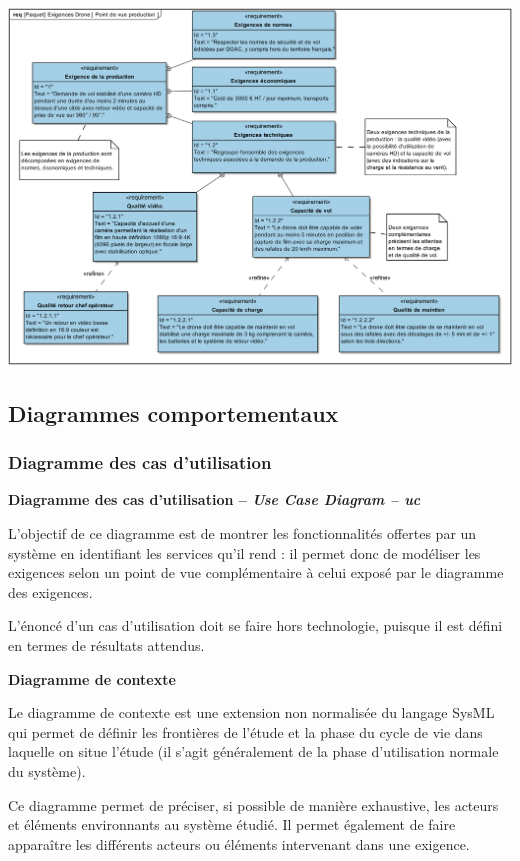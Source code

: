 \documentclass[11pt,oneside]{article}
\begin{document}
\begin{exemple}
\begin{center}
\includegraphics[width=.8\textwidth]{png/PNG/SysML_Drone_Req}
\end{center}
\end{exemple}

\subsection{Diagrammes comportementaux}
\subsubsection{Diagramme des cas d'utilisation}

\begin{defi}
\textbf{Diagramme des cas d'utilisation -- \textit{Use Case Diagram  -- uc}}

L’objectif de ce diagramme est de montrer les fonctionnalités offertes par un système en
identifiant les services qu’il rend : il permet donc de modéliser les exigences selon un point
de vue complémentaire à celui exposé par le diagramme des exigences.

L’énoncé d’un cas d’utilisation doit se faire hors technologie, puisque il est défini en termes
de résultats attendus.

\end{defi}

\begin{defi}
\textbf{Diagramme de contexte}

Le diagramme de contexte est une extension non normalisée du langage SysML qui permet
de définir les frontières de l’étude et la phase du cycle de vie dans laquelle on situe l’étude (il
s’agit généralement de la phase d’utilisation normale du système).

Ce diagramme permet de préciser, si possible de manière exhaustive, les acteurs et éléments
environnants au système étudié. Il permet également de faire apparaître les différents acteurs
ou éléments intervenant dans une exigence.
\end{defi}
\end{document}
